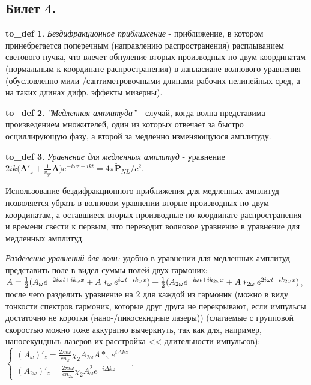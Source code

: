 \documentclass[a4paper,12pt]{article}
\theoremstyle{definition} %
\theoremstyle{definition} %
\newtheorem{to_def}{to_def}[section]
\theoremstyle{remark} %
\begin{document}
	
\subsection{Билет 4.}

\begin{to_def}
	\textit{Бездифракционное приближение} - приближение, в котором принебрегается поперечным (направлению распространения) расплыванием светового пучка, что влечет обнуление вторых производных по двум координатам (нормальным к координате распространения) в лапласиане волнового уравнения (обусловленно мили-/сантиметровочными длинами рабочих нелинейных сред, а на таких длинах дифр. эффекты мизерны).
\end{to_def}
\begin{to_def}
	\textit{''Медленная амплитуда''} - случай, когда волна представима произведением множителей, один из которых отвечает за быстро осциллирующую фазу, а второй за медленно изменяющуюся амплитуду.
\end{to_def}
\begin{to_def}
	\textit{Уравнение для медленных амплитуд} - уравнение $2ik \big( \mathbf{A}'_{z} + \frac{1}{v_{gr}} \dot{\mathbf{A}} \big) e^{-i\omega z + ikt} = 4\pi \ddot{\mathbf{P}}_{NL}/c^{2}$.
\end{to_def}

Использование бездифракционного приближения для медленных амплитуд позволяется убрать в волновом уравнении вторые производных по двум координатам, а оставшиеся вторых производные по координате распространения и времени свести к первым, что переводит волновое уравнение в уравнение для медленных амплитуд.


\textit{Разделение уравнений для волн:} удобно в уравнении для медленных амплитуд представить поле в видел суммы полей двух гармоник: $A = \frac{1}{2} (A_{\omega}e^{-2i\omega t +i k_{\omega}x} + A*_{\omega}e^{i\omega t -i k_{\omega}x}) + \\ \frac{1}{2} (A_{2\omega}e^{-i\omega t +i k_{2\omega}x} + A*_{2\omega}e^{2i\omega t -i k_{2\omega}x})$, после чего разделить уравнение на 2 для каждой из гармоник (можно в виду тонкости спектров гармоник, которые друг друга не перекрывают, если импульсы достаточно не коротки (нано-/пикосекндные лазеры)) (слагаемые с групповой скоростью можно тоже аккуратно вычеркнуть, так как для, например, наносекундныъ лазеров их расстройка << длительности импульсов): $
	\begin{cases}
		(A_{\omega})'_{z}=\frac{2\pi i \omega}{cn_{\omega}} \chi_{2} A_{2\omega}A*_{\omega} e^{i \Delta k z} \\
		(A_{2\omega})'_{z}=\frac{2\pi i \omega}{cn_{2\omega}} \chi_{2} A_{\omega}^{2} e^{- i \Delta k z} 
	\end{cases}$.
\end{document}
